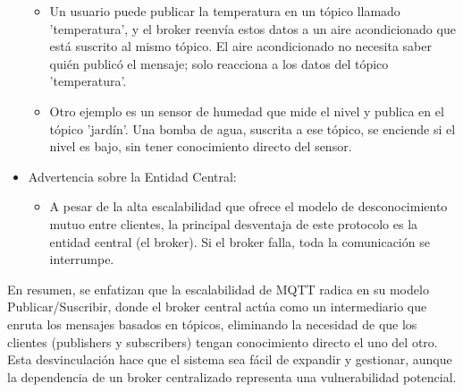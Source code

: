 \documentclass{report}
\begin{document}
\begin{itemize}
\begin{itemize}
            \item Un usuario puede publicar la temperatura en un tópico llamado 'temperatura', y el broker reenvía estos datos a un aire 
            acondicionado que está suscrito al mismo tópico. El aire acondicionado no necesita saber quién publicó el mensaje; solo reacciona 
            a los datos del tópico 'temperatura'.
            \item Otro ejemplo es un sensor de humedad que mide el nivel y publica en el tópico 'jardín'. Una bomba de agua, suscrita a 
            ese tópico, se enciende si el nivel es bajo, sin tener conocimiento directo del sensor.
        \end{itemize}
    \item Advertencia sobre la Entidad Central:
        \begin{itemize}
            \item A pesar de la alta escalabilidad que ofrece el modelo de desconocimiento mutuo entre clientes, la principal desventaja 
            de este protocolo es la entidad central (el broker). Si el broker falla, toda la comunicación se interrumpe.        
        \end{itemize}
\end{itemize}
En resumen, se  enfatizan que la escalabilidad de MQTT radica en su modelo Publicar/Suscribir, donde el broker central actúa 
como un intermediario que enruta los mensajes basados en tópicos, eliminando la necesidad de que los clientes (publishers y subscribers) 
tengan conocimiento directo el uno del otro. Esta desvinculación hace que el sistema sea fácil de expandir y gestionar, aunque la 
dependencia de un broker centralizado representa una vulnerabilidad potencial.
\end{document}
